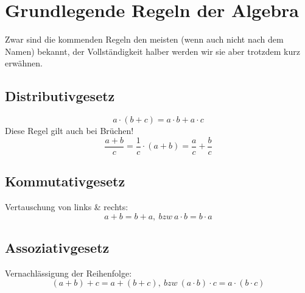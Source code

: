 \section{Grundlegende Regeln der Algebra}
	Zwar sind die kommenden Regeln den meisten (wenn auch nicht nach dem Namen)
	bekannt, der Vollständigkeit halber werden wir sie aber trotzdem kurz erwähnen.
	\subsection{Distributivgesetz}
		\[a\cdot (b+c)=a\cdot b+a\cdot c\]
		Diese Regel gilt auch bei Brüchen!
		\[\frac{a+b}{c}=\frac{1}{c}\cdot (a+b)=\frac{a}{c}+\frac{b}{c}\]
	\subsection{Kommutativgesetz}
		Vertauschung von links \& rechts:
		\[a+b=b+a,\ bzw\ a\cdot b=b\cdot a\]
	\subsection{Assoziativgesetz}
		Vernachlässigung der Reihenfolge:
		\[(a+b)+c=a+(b+c),\ bzw\ (a\cdot b)\cdot c=a\cdot (b\cdot c)\]